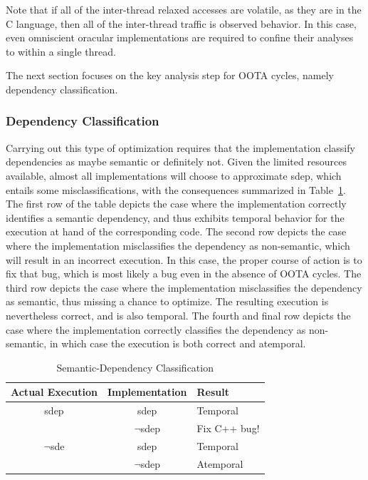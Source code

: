 \documentclass[10]{article}
\begin{document}
Note that if all of the inter-thread relaxed accesses are volatile,
as they are in the C language, then all of the inter-thread traffic is
observed behavior.
In this case, even omniscient oracular implementations are required
to confine their analyses to within a single thread.

The next section focuses on the key analysis step for OOTA cycles,
namely dependency classification.

\subsubsection{Dependency Classification}
\label{sec:Dependency Classification}

Carrying out this type of optimization requires that the implementation
classify dependencies as maybe semantic or definitely not.
Given the limited resources available, almost all implementations will
choose to approximate sdep, which entails some misclassifications, with
the consequences summarized in
Table~\ref{tab:Semantic-Dependency Classification}.
The first row of the table depicts the case where the implementation
correctly identifies a semantic dependency, and thus exhibits temporal
behavior for the execution at hand of the corresponding code.
The second row depicts the case where the implementation misclassifies
the dependency as non-semantic, which will result in an incorrect
execution.
In this case, the proper course of action is to fix that bug, which is
most likely a bug even in the absence of OOTA cycles.
The third row depicts the case where the implementation misclassifies
the dependency as semantic, thus missing a chance to optimize.
The resulting execution is nevertheless correct, and is also temporal.
The fourth and final row depicts the case where the implementation
correctly classifies the dependency as non-semantic, in which case
the execution is both correct and atemporal.

\begin{table}
\centering
\begin{tabular}{c|c|l}
Actual Execution	& Implementation	& Result \\
\hline
sdep			& sdep			& Temporal \\
\cline{2-3}
			& $\neg$sdep		& Fix C++ bug! \\
\hline
$\neg$sde		& sdep			& Temporal \\
\cline{2-3}
			& $\neg$sdep		& Atemporal \\
\end{tabular}
\caption{Semantic-Dependency Classification}
\label{tab:Semantic-Dependency Classification}
\end{table}
\end{document}
